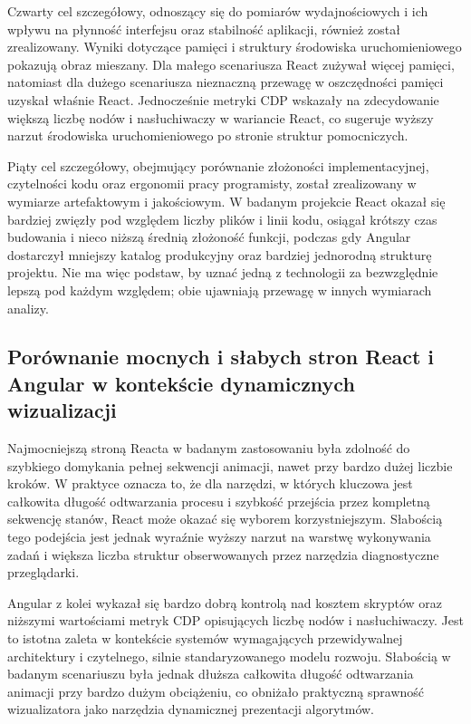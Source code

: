 \documentclass[12pt,openright,twoside]{report}
\begin{document}
Czwarty cel szczegółowy, odnoszący się do pomiarów wydajnościowych i ich wpływu na płynność interfejsu oraz stabilność aplikacji, również został zrealizowany. Wyniki dotyczące pamięci i struktury środowiska uruchomieniowego pokazują obraz mieszany. Dla małego scenariusza React zużywał więcej pamięci, natomiast dla dużego scenariusza nieznaczną przewagę w oszczędności pamięci uzyskał właśnie React. Jednocześnie metryki CDP wskazały na zdecydowanie większą liczbę nodów i nasłuchiwaczy w wariancie React, co sugeruje wyższy narzut środowiska uruchomieniowego po stronie struktur pomocniczych.

Piąty cel szczegółowy, obejmujący porównanie złożoności implementacyjnej, czytelności kodu oraz ergonomii pracy programisty, został zrealizowany w wymiarze artefaktowym i jakościowym. W badanym projekcie React okazał się bardziej zwięzły pod względem liczby plików i linii kodu, osiągał krótszy czas budowania i nieco niższą średnią złożoność funkcji, podczas gdy Angular dostarczył mniejszy katalog produkcyjny oraz bardziej jednorodną strukturę projektu. Nie ma więc podstaw, by uznać jedną z technologii za bezwzględnie lepszą pod każdym względem; obie ujawniają przewagę w innych wymiarach analizy.

\subsection{Porównanie mocnych i słabych stron React i Angular w kontekście dynamicznych wizualizacji}
Najmocniejszą stroną Reacta w badanym zastosowaniu była zdolność do szybkiego domykania pełnej sekwencji animacji, nawet przy bardzo dużej liczbie kroków. W praktyce oznacza to, że dla narzędzi, w których kluczowa jest całkowita długość odtwarzania procesu i szybkość przejścia przez kompletną sekwencję stanów, React może okazać się wyborem korzystniejszym. Słabością tego podejścia jest jednak wyraźnie wyższy narzut na warstwę wykonywania zadań i większa liczba struktur obserwowanych przez narzędzia diagnostyczne przeglądarki.

Angular z kolei wykazał się bardzo dobrą kontrolą nad kosztem skryptów oraz niższymi wartościami metryk CDP opisujących liczbę nodów i nasłuchiwaczy. Jest to istotna zaleta w kontekście systemów wymagających przewidywalnej architektury i czytelnego, silnie standaryzowanego modelu rozwoju. Słabością w badanym scenariuszu była jednak dłuższa całkowita długość odtwarzania animacji przy bardzo dużym obciążeniu, co obniżało praktyczną sprawność wizualizatora jako narzędzia dynamicznej prezentacji algorytmów.
\end{document}
